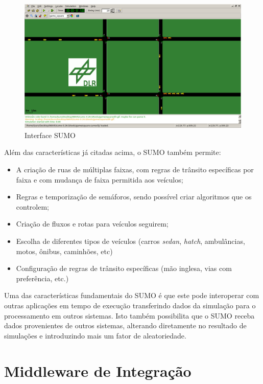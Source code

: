 \documentclass[
12pt,				%
openright,			%
oneside,			%
a4paper,			%
brazil,				%
]{abntex2}
\begin{document}
	\begin{figure} [H]
		\centering
		\includegraphics[scale=.3]{figuras/cap4/45InterfaceSUMO}
		\caption{\label{fig_45}Interface SUMO}
	\end{figure}
	
	\par Além das características já citadas acima, o SUMO também permite:
	
	\begin{itemize}
		\item A criação de ruas de múltiplas faixas, com regras de trânsito específicas por faixa e com mudança de faixa permitida aos veículos;
		\item Regras e temporização de semáforos, sendo possível criar algoritmos que os controlem;
		\item Criação de fluxos e rotas para veículos seguirem;
		\item Escolha de diferentes tipos de veículos (carros \textit{sedan}, \textit{hatch}, ambulâncias, motos, ônibus, caminhões, etc)
		\item Configuração de regras de trânsito específicas (mão inglesa, vias com preferência, etc.)		
	\end{itemize}
	
	\par Uma das características fundamentais do SUMO é que este pode interoperar com outras aplicações em tempo de execução transferindo dados da simulação para o processamento em outros sistemas. Isto também possibilita que o SUMO receba dados provenientes de outros sistemas, alterando diretamente no resultado de simulações e introduzindo mais um fator de aleatoriedade.
	
	\section{Middleware de Integração}
	\label{sec:MiddleIntegra}
	
\end{document}

